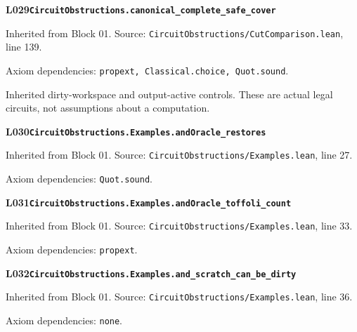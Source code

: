 \begin{minipage}{\linewidth}
\hypertarget{L029}{}
{\small\sffamily\bfseries\color{ink}L029\quad\nolinkurl{CircuitObstructions.canonical_complete_safe_cover}}\par
{\scriptsize\sffamily\color{muted}Inherited from Block 01. Source: \nolinkurl{CircuitObstructions/CutComparison.lean}, line 139.}\par
{}
{\scriptsize\sffamily\color{muted}Axiom dependencies: \nolinkurl{propext, Classical.choice, Quot.sound}.}
\end{minipage}\par\medskip
{}
Inherited dirty-workspace and output-active controls. These are actual legal circuits, not assumptions about a computation.
\par\medskip
\begin{minipage}{\linewidth}
\hypertarget{L030}{}
{\small\sffamily\bfseries\color{ink}L030\quad\nolinkurl{CircuitObstructions.Examples.andOracle_restores}}\par
{\scriptsize\sffamily\color{muted}Inherited from Block 01. Source: \nolinkurl{CircuitObstructions/Examples.lean}, line 27.}\par
{}
{\scriptsize\sffamily\color{muted}Axiom dependencies: \nolinkurl{Quot.sound}.}
\end{minipage}\par\medskip
\begin{minipage}{\linewidth}
\hypertarget{L031}{}
{\small\sffamily\bfseries\color{ink}L031\quad\nolinkurl{CircuitObstructions.Examples.andOracle_toffoli_count}}\par
{\scriptsize\sffamily\color{muted}Inherited from Block 01. Source: \nolinkurl{CircuitObstructions/Examples.lean}, line 33.}\par
{}
{\scriptsize\sffamily\color{muted}Axiom dependencies: \nolinkurl{propext}.}
\end{minipage}\par\medskip
\begin{minipage}{\linewidth}
\hypertarget{L032}{}
{\small\sffamily\bfseries\color{ink}L032\quad\nolinkurl{CircuitObstructions.Examples.and_scratch_can_be_dirty}}\par
{\scriptsize\sffamily\color{muted}Inherited from Block 01. Source: \nolinkurl{CircuitObstructions/Examples.lean}, line 36.}\par
{}
{\scriptsize\sffamily\color{muted}Axiom dependencies: \nolinkurl{none}.}
\end{minipage}\par\medskip
